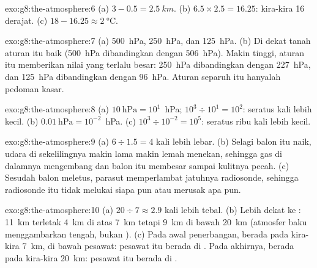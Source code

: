 \begin{solution}{exo:g8:the-atmosphere:6}
(a) $3 - 0.5 = \qty{2.5}{km}$. (b) $6.5 \times 2.5 = 16.25$: kira-kira 16
derajat. (c) $18 - 16.25 \approx \qty{2}{\degreeCelsius}$.
\end{solution}

\begin{solution}{exo:g8:the-atmosphere:7}
(a) \qty{500}{hPa}, \qty{250}{hPa}, dan \qty{125}{hPa}. (b) Di dekat tanah
aturan itu baik (\qty{500}{hPa} dibandingkan dengan \qty{506}{hPa}). Makin
tinggi, aturan itu memberikan nilai yang terlalu besar: \qty{250}{hPa}
dibandingkan dengan \qty{227}{hPa}, dan \qty{125}{hPa} dibandingkan dengan
\qty{96}{hPa}. Aturan separuh itu hanyalah pedoman kasar.
\end{solution}

\begin{solution}{exo:g8:the-atmosphere:8}
(a) $10~\text{hPa} = 10^1$~hPa; $10^3 \div 10^1 = 10^2$: seratus kali
lebih kecil. (b) $0.01~\text{hPa} = 10^{-2}$~hPa. (c) $10^3 \div 10^{-2} =
10^5$: seratus ribu kali lebih kecil.
\end{solution}

\begin{solution}{exo:g8:the-atmosphere:9}
(a) $6 \div 1.5 = 4$ kali lebih lebar. (b) Selagi balon itu naik, udara di
sekelilingnya makin lama makin lemah menekan, sehingga gas di dalamnya
mengembang dan balon itu membesar sampai kulitnya pecah. (c) Sesudah balon
meletus, parasut memperlambat jatuhnya radiosonde, sehingga radiosonde itu
tidak melukai siapa pun atau merusak apa pun.
\end{solution}

\begin{solution}{exo:g8:the-atmosphere:10}
(a) $20 \div 7 \approx 2.9$ kali lebih tebal. (b) Lebih dekat ke :
\qty{11}{km} terletak \qty{4}{km} di atas \qty{7}{km} tetapi \qty{9}{km} di bawah \qty{20}{km} (atmosfer baku menggambarkan  tengah, bukan ).
(c) Pada awal penerbangan,  berada pada kira-kira \qty{7}{km}, di
bawah pesawat: pesawat itu berada di . Pada akhirnya, 
berada pada kira-kira \qty{20}{km}: pesawat itu berada di .
\end{solution}

